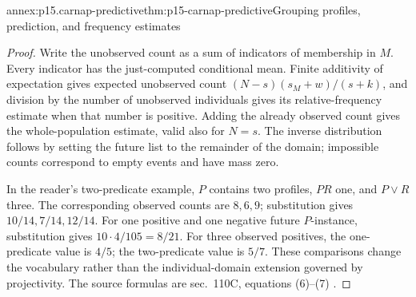 \begin{annexitem}{annex:p15.carnap-predictive}{thm:p15-carnap-predictive}{Grouping profiles, prediction, and frequency estimates}
\begin{proof}
Write the unobserved count as a sum of indicators of membership in
\(M\). Every indicator has the just-computed conditional mean.
Finite additivity of expectation gives expected unobserved count
\((N-s)(s_M+w)/(s+k)\), and division by the number of unobserved
individuals gives its relative-frequency estimate when that number is
positive. Adding the already observed count gives the whole-population
estimate, valid also for \(N=s\). The inverse distribution follows
by setting the future list to the remainder of the domain; impossible
counts correspond to empty events and have mass zero.

In the reader's two-predicate example, \(P\) contains two profiles,
\(PR\) one, and \(P\lor R\) three. The corresponding observed
counts are \(8,6,9\); substitution gives \(10/14,7/14,12/14\).
For one positive and one negative future \(P\)-instance, substitution
gives \(10\cdot4/105=8/21\). For three observed positives, the
one-predicate value is \(4/5\); the two-predicate value is \(5/7\).
These comparisons change the vocabulary rather than the individual-domain
extension governed by projectivity. The source formulas are sec.~110C,
equations (6)--(7) \cite{Carnap1950Probability}.
\end{proof}
\end{annexitem}

